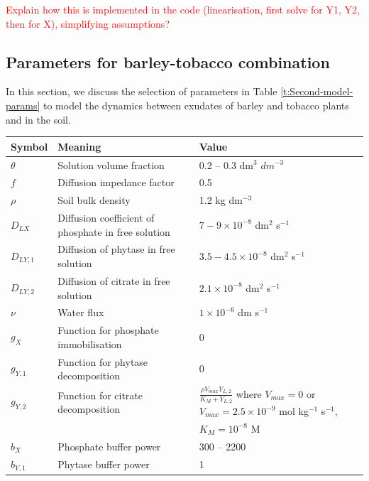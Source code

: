 \documentclass[11pt]{article}
\numberwithin{equation}{section}
\begin{document}
\textcolor{red}{Explain how this is implemented in the code (linearisation, first solve for Y1, Y2, then for X), simplifying assumptions?}


\subsection{Parameters for barley-tobacco combination}
In this section, we discuss the selection of parameters in Table \ref{t:Second-model-params} to model the dynamics between exudates of barley and tobacco plants and  in the soil.

\begin{table}[!htb]
\begin{center}
\fontsize{9.5}{7}\selectfont
\setlength{\tabcolsep}{5.pt}
\def\arraystretch{1.5}
\begin{tabular}{lll}
\toprule
    \bf Symbol & \multicolumn{1}{l}{\bf Meaning} & \bf Value
    \\ \midrule
    $\theta$ & Solution volume fraction & 0.2 -- 0.3 dm$^3$ $dm^{-3}$ \\
    $f$ & Diffusion impedance factor & 0.5 \\ 
    $\rho$ & Soil bulk density & 1.2 kg dm$^{-3}$ \\
    $D_{LX} $ & Diffusion coefficient of phosphate in free solution & $7-9 \times 10^{-8}$ dm$^2$ s$^{-1}$ \\  
	$D_{LY,1}$ &  Diffusion of phytase in free solution & $3.5 - 4.5 \times 10^{-8}$ dm$^2$ s$^{-1}$ \\   
	$D_{LY,2}$ & Diffusion of citrate in free solution & $2.1 \times 10^{-8}$ dm$^2$ s$^{-1}$ \\
	$\nu$ & Water flux & $1 \times 10^{-6}$ dm s$^{-1}$\\
	$g_X$ & Function for phosphate immobilisation & 0 \\
	$g_{Y,1}$ & Function for phytase decomposition & 0 \\
	$g_{Y,2}$ & Function for citrate decomposition & $\frac{\rho V_{max} Y_{L,2} }{K_M + Y_{L,2} }$ where $V_{max} = 0$ or $V_{max} = 2.5 \times 10^{-9}$ mol kg$^{-1}$ s$^{-1}$, \\
	 & & $K_M=10^{-8}$ M \\
	$b_X$ & Phosphate buffer power & 300 -- 2200 \\
	$b_{Y,1}$ & Phytase buffer power & 1 \\

\end{tabular}
\end{center}
\end{table}
\end{document}
